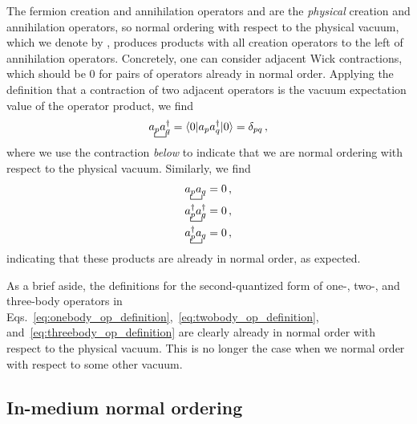 The fermion creation and annihilation operators  and 
are the \textit{physical} creation and annihilation operators,
so normal ordering with respect to the physical vacuum,
which we denote by \novac{\ldots},
produces products with all creation operators to the left of annihilation operators.
Concretely, one can consider adjacent Wick contractions,
which should be 0 for pairs of operators already in normal order.
Applying the definition that a contraction of two adjacent operators
is the vacuum expectation value of the operator product,
we find
\begin{equation}
  \bcontraction{}{\annih{p}}{}{\crea{q}} \annih{p}\crea{q} = \braket{0|\annih{p} \crea{q} | 0} = \delta_{pq}\,,
\end{equation}
where we use the contraction \textit{below}
to indicate that we are normal ordering with respect to the physical vacuum.
Similarly, we find
\begin{align}
  \bcontraction{}{\annih{p}}{}{\annih{q}} \annih{p}\annih{q} &= 0\,, \\
  \bcontraction{}{\crea{p}}{}{\crea{q}} \crea{p}\crea{q} &= 0\,, \\
  \bcontraction{}{\crea{p}}{}{\annih{q}} \crea{p}\annih{q} &= 0\,,
\end{align}
indicating that these products are already in normal order, as expected.

As a brief aside,
the definitions for the second-quantized form of one-, two-, and three-body operators
in Eqs.~\ref{eq:onebody_op_definition},~\ref{eq:twobody_op_definition}, and~\ref{eq:threebody_op_definition}
are clearly already in normal order with respect to the physical vacuum.
This is no longer the case when we normal order with respect to some other vacuum.

\subsection{In-medium normal ordering}

